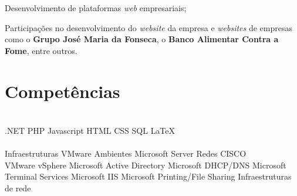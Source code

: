 \documentclass[letterpaper]{deedy-resume} %
\begin{document}
\begin{minipage}[t]{0.66\textwidth}
\sectionspace


\begin{tightitemize}
	\item Desenvolvimento de plataformas \textit{web} empresariais;
	\item Participações no desenvolvimento do \textit{website} da empresa e \textit{websites} de empresas como o \textbf{Grupo José Maria da Fonseca}, o \textbf{Banco Alimentar Contra a Fome}, entre outros.
\end{tightitemize}

\sectionspace

\section{Competências}

\\
.NET \textbullet{} PHP \textbullet{} Javascript \textbullet{} HTML \textbullet{} CSS \textbullet{} SQL \textbullet{} \LaTeX{}\\
\\
Infraestruturas VMware \textbullet{} Ambientes Microsoft Server \textbullet{} Redes CISCO\\
VMware vSphere \textbullet{} Microsoft Active Directory \textbullet{} Microsoft DHCP/DNS \textbullet{} Microsoft Terminal Services \textbullet{} Microsoft IIS \textbullet{} Microsoft Printing/File Sharing \textbullet{} Infraestruturas de rede

\end{minipage} %








\end{document}
